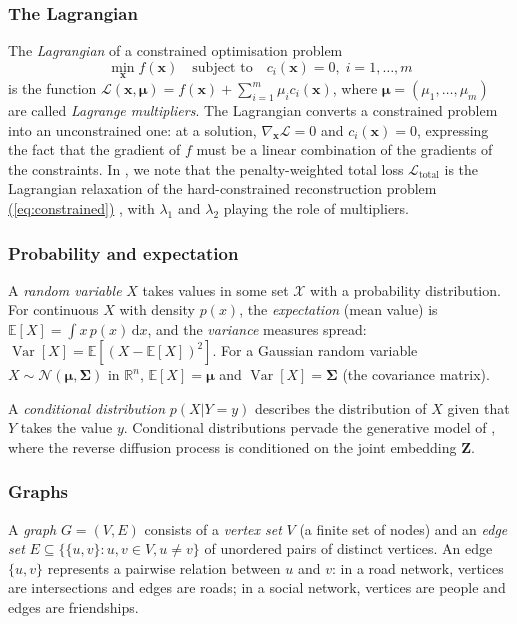 \documentclass[11pt,a4paper]{article}
\renewcommand{\eqref}[1]{%
    \hyperref[#1]{\textcolor{eqred}{(\ref*{#1})}}%
}
\theoremstyle{plain}
\theoremstyle{definition}
\theoremstyle{remark}
\newcommand{\dd}{\mathrm{d}}
\newcommand{\E}{\mathbb{E}}
\newcommand{\Var}{\operatorname{Var}}
\newcommand{\Ltot}{\mathcal{L}_{\mathrm{total}}}
\begin{document}
\subsubsection{The Lagrangian}

The \emph{Lagrangian} of a constrained optimisation problem
\[
  \min_{\mathbf{x}} f(\mathbf{x})
  \quad \text{subject to} \quad c_i(\mathbf{x}) = 0, \; i = 1,\ldots,m
\]
is the function
$\mathcal{L}(\mathbf{x}, \boldsymbol{\mu})
= f(\mathbf{x}) + \sum_{i=1}^m \mu_i c_i(\mathbf{x})$,
where $\boldsymbol{\mu} = (\mu_1, \ldots, \mu_m)$ are called
\emph{Lagrange multipliers}. The Lagrangian converts a constrained
problem into an unconstrained one: at a solution, $\nabla_{\mathbf{x}}
\mathcal{L} = 0$ and $c_i(\mathbf{x}) = 0$, expressing the fact that
the gradient of $f$ must be a linear combination of the gradients of
the constraints. In , we note that the
penalty-weighted total loss $\Ltot$ is the Lagrangian relaxation of
the hard-constrained reconstruction problem \eqref{eq:constrained},
with $\lambda_1$ and $\lambda_2$ playing the role of multipliers.

\subsubsection{Probability and expectation}

A \emph{random variable} $X$ takes values in some set $\mathcal{X}$
with a probability distribution. For continuous $X$ with density
$p(x)$, the \emph{expectation} (mean value) is
$\E[X] = \int x\,p(x)\,\dd x$, and the \emph{variance} measures
spread: $\Var[X] = \E[(X - \E[X])^2]$. For a Gaussian random variable
$X \sim \mathcal{N}(\boldsymbol{\mu}, \boldsymbol{\Sigma})$ in
$\mathbb{R}^n$, $\E[X] = \boldsymbol{\mu}$ and
$\Var[X] = \boldsymbol{\Sigma}$ (the covariance matrix).

A \emph{conditional distribution} $p(X | Y = y)$ describes the
distribution of $X$ given that $Y$ takes the value $y$. Conditional
distributions pervade the generative model of ,
where the reverse diffusion process is conditioned on the joint
embedding $\mathbf{Z}$.

\subsubsection{Graphs}

A \emph{graph} $G = (V, E)$ consists of a \emph{vertex set} $V$
(a finite set of nodes) and an \emph{edge set}
$E \subseteq \{\{u, v\} : u, v \in V, u \neq v\}$ of unordered pairs
of distinct vertices. An edge $\{u, v\}$ represents a pairwise
relation between $u$ and $v$: in a road network, vertices are
intersections and edges are roads; in a social network, vertices are
people and edges are friendships.
\end{document}
